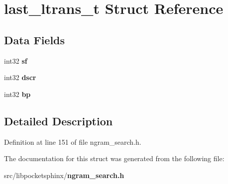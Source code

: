 \section{last\-\_\-ltrans\-\_\-t Struct Reference}
\label{structlast__ltrans__t}
\subsection*{Data Fields}
\begin{DoxyCompactItemize}
\item 
int32 {\bfseries sf}\label{structlast__ltrans__t_acaf16ee92b14121c8e357ff4c1c517d7}

\item 
int32 {\bfseries dscr}\label{structlast__ltrans__t_acef04cbac672e225406402f56002c153}

\item 
int32 {\bfseries bp}\label{structlast__ltrans__t_ae42bf37affec23a3f3ea46131aa82c99}

\end{DoxyCompactItemize}


\subsection{Detailed Description}


Definition at line 151 of file ngram\-\_\-search.\-h.



The documentation for this struct was generated from the following file\-:\begin{DoxyCompactItemize}
\item 
src/libpocketsphinx/{\bf ngram\-\_\-search.\-h}\end{DoxyCompactItemize}

